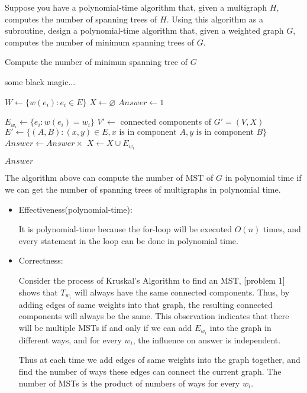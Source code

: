 \begin{thm}{}{}
    Suppose you have a polynomial-time algorithm that, given a multigraph $H$, computes the number of spanning trees of $H$. Using this algorithm as a subroutine, design a polynomial-time algorithm that, given a weighted graph $G$, computes the number of minimum spanning trees of $G$.
\end{thm}

\begin{algorithm}
    \caption{Compute the number of minimun spanning tree of $G$}
    \begin{algorithmic}

        some black magic...

        \EndFunction


        \State $W \gets \{w(e_i): e_i \in E\}$
        \State $X \gets \varnothing$
        \State $Answer \gets 1$


        \State $E_{w_i} \gets \{e_i: w(e_i) = w_i\} $
        \State $V' \gets$ connected components of $G' = (V, X)$
        \State $E' \gets \{(A, B): (x, y) \in E, x \text{ is in component } A, y \text{ is in component } B\}$
        \State $Answer \gets Answer \times$ 
        \State $X \gets X \cup E_{w_i}$

        \EndFor

        \Return $Answer$

        \EndFunction
    \end{algorithmic}

\end{algorithm}

The algorithm above can compute the number of MST of $G$ in polynomial time if we can get the number of spanning trees of multigraphs in polynomial time.
\begin{itemize}
    \item Effectiveness(polynomial-time):

        It is polynomial-time because the for-loop will be executed $O(n)$ times, and every statement in the loop can be done in polynomial time.

    \item Correctness:

        Consider the process of Kruskal's Algorithm to find an MST, [problem 1] shows that $T_{w_i}$ will always have the same connected components. Thus, by adding edges of same weights into that graph, the resulting connected components will always be the same. This observation indicates that there will be multiple MSTs if and only if we can add $E_{w_i}$ into the graph in different ways, and for every $w_i$, the influence on answer is independent.

        Thus at each time we add edges of same weights into the graph together, and find the number of ways these edges can connect the current graph. The number of MSTs is the product of numbers of ways for every $w_i$.
\end{itemize}


